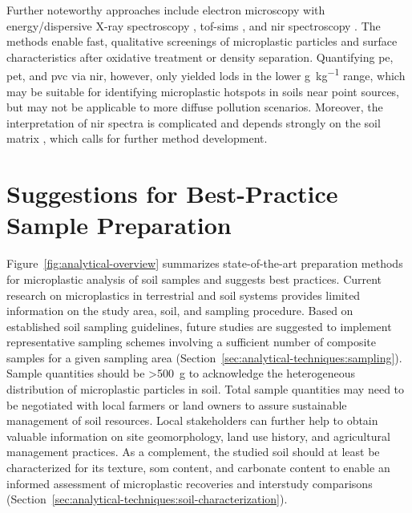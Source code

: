 Further noteworthy approaches include electron microscopy with energy\-/dispersive X-ray spectroscopy \citep{WatteauMicroplastic2018}, \ac{tof-sims} \citep{DuToFSIMS2020}, and \ac{nir} spectroscopy \citep{PaulHighthroughput2019,CorradiniPredicting2019}. The methods enable fast, qualitative screenings of microplastic particles and surface characteristics after oxidative treatment or density separation.
Quantifying \ac{pe}, \ac{pet}, and \ac{pvc} via \ac{nir}, however, only yielded \acp{lod} in the lower \si{\gram\per\kilo\gram} range, which may be suitable for identifying microplastic hotspots in soils near point sources, but may not be applicable to more diffuse pollution scenarios. Moreover, the interpretation of \ac{nir} spectra is complicated and depends strongly on the soil matrix \citep{CorradiniPredicting2019}, which calls for further method development.

\section{Suggestions for Best-Practice Sample Preparation}
\label{sec:analytical-techniques:suggestions}

Figure~\ref{fig:analytical-overview} summarizes state-of-the-art preparation methods for microplastic analysis of soil samples and suggests best practices. Current research on microplastics in terrestrial and soil systems provides limited information on the study area, soil, and sampling procedure. Based on established soil sampling guidelines, future studies are suggested to implement representative sampling schemes involving a sufficient number of composite samples for a given sampling area (Section~\ref{sec:analytical-techniques:sampling}). Sample quantities should be \SI{>500}{\gram} to acknowledge the heterogeneous distribution of microplastic particles in soil. Total sample quantities may need to be negotiated with local farmers or land owners to assure sustainable management of soil resources. Local stakeholders can further help to obtain valuable information on site geomorphology, land use history, and agricultural management practices. As a complement, the studied soil should at least be characterized for its texture, \ac{som} content, and carbonate content to enable an informed assessment of microplastic recoveries and interstudy comparisons (Section~\ref{sec:analytical-techniques:soil-characterization}).

